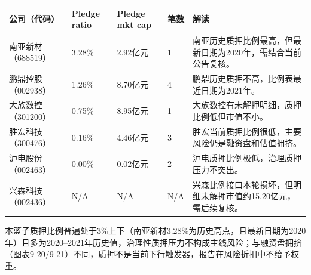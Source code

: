 \begin{exhibitbox}
\footnotesize
\begin{tabularx}{\textwidth}{L{1.8cm}R{1.5cm}R{1.8cm}R{1.5cm}X}
\toprule
\textbf{公司（代码）} & \textbf{Pledge ratio} & \textbf{Pledge mkt cap} & \textbf{笔数} & \textbf{解读} \\
\midrule
南亚新材（688519） & 3.28\% & 2.92亿元 & 1 & 南亚历史质押比例最高，但最新日期为2020年，需结合当前公告复核。 \\
鹏鼎控股（002938） & 1.26\% & 8.70亿元 & 4 & 鹏鼎历史质押不高，比例表最近日期为2021年。 \\
大族数控（301200） & 0.75\% & 8.95亿元 & 1 & 大族数控有未解押明细，质押比例低但市值不小。 \\
胜宏科技（300476） & 0.16\% & 4.46亿元 & 3 & 胜宏当前质押比例很低，主要风险仍是融资盘和估值拥挤。 \\
沪电股份（002463） & 0.00\% & 0.02亿元 & 2 & 沪电质押比例极低，治理质押压力不突出。 \\
兴森科技（002436） & N/A & N/A & N/A & 兴森比例接口本轮损坏，但明细未解押市值约15.20亿元，需后续复核。 \\
\bottomrule
\end{tabularx}
\end{exhibitbox}

本篮子质押比例普遍处于3\%上下（南亚新材3.28\%为历史高点，且最新日期为2020年）且多为2020–2021年历史值，治理性质押压力不构成主线风险；与融资盘拥挤（图表9-20/9-21）不同，质押不是当前下行触发器，报告在风险折扣中不给予权重。

